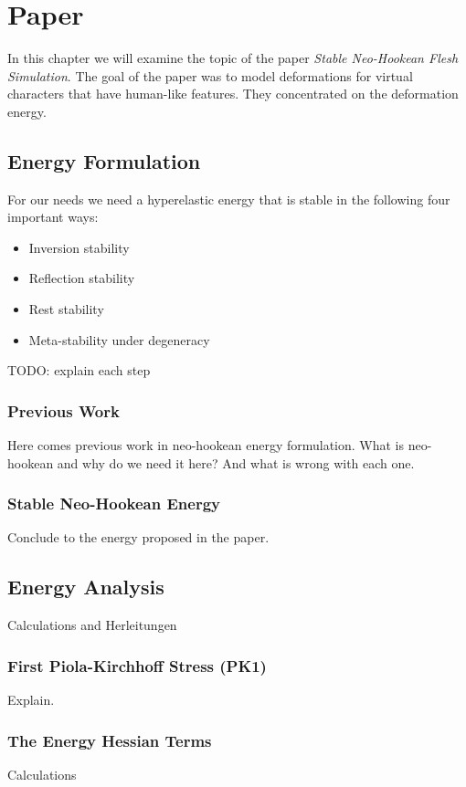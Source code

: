 \chapter{Paper} \label{c:Paper}
In this chapter we will examine the topic of the paper \textit{Stable Neo-Hookean Flesh Simulation}. The goal of the paper was to model deformations for virtual characters that have human-like features. They concentrated on the deformation energy.

\section{Energy Formulation}

For our needs we need a hyperelastic energy that is stable in the following four important ways:

\begin{itemize}
\item Inversion stability
\item Reflection stability
\item Rest stability
\item Meta-stability under degeneracy
\end{itemize}

TODO: explain each step

\subsection{Previous Work}
Here comes previous work in neo-hookean energy formulation. What is neo-hookean and why do we need it here?
And what is wrong with each one.

\subsection{Stable Neo-Hookean Energy}
Conclude to the energy proposed in the paper.

\section{Energy Analysis}
Calculations and Herleitungen

\subsection{First Piola-Kirchhoff Stress (PK1)}
Explain.

\subsection{The Energy Hessian Terms}
Calculations

